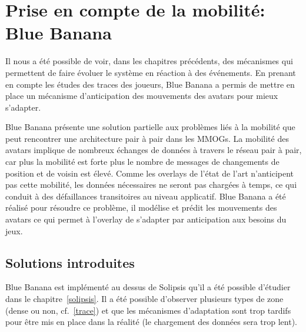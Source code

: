 \section{Prise en compte de la mobilité: Blue Banana}
	\label{BlueBanana}
	Il nous a été possible de voir, dans les chapitres précédents, des mécanismes qui permettent de faire évoluer le système en réaction à des événements. En prenant en compte les études des traces des joueurs, Blue Banana a permis de mettre en place un mécanisme d'anticipation des mouvements des avatars pour mieux s'adapter.
	\par Blue Banana présente une solution partielle aux problèmes liés à la mobilité que peut rencontrer une architecture pair à pair dans les MMOGs. La mobilité des avatars implique de nombreux échanges de données à travers le réseau pair à pair, car plus la mobilité est forte plus le nombre de messages de changements de position et de voisin est élevé. Comme les overlays de l'état de l'art n'anticipent pas cette mobilité, les données nécessaires ne seront pas chargées à temps, ce qui conduit à des défaillances transitoires au niveau applicatif. Blue Banana a été réalisé pour résoudre ce problème, il modélise et prédit les mouvements des avatars ce qui permet à l'overlay de s'adapter par anticipation aux besoins du jeux.
	\subsection{Solutions introduites}
	Blue Banana est implémenté au dessus de Solipsis qu'il a été possible d'étudier dans le chapitre~\ref{solipsis}. Il a été possible d'observer plusieurs types de zone (dense ou non, cf.~\ref{trace}) et que les mécanismes d'adaptation sont trop tardifs pour être mis en place dans la réalité (le chargement des données sera trop lent).
